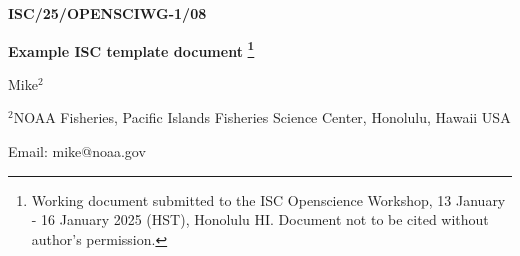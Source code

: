 \thispagestyle{empty}
\begin{flushright}
    \textbf{ISC/25/OPENSCIWG-1/08}
\end{flushright}
\vspace{1in}

\begin{center}
    \textbf{Example ISC template document}
    \textbf{\footnote{Working document submitted to the ISC Openscience Workshop, 13 January - 16 January 2025
    (HST), Honolulu HI. Document not to be cited without author’s permission.}}
    
    \vspace{0.25in}
    Mike\begin{math}^2\end{math} %

    \vspace{0.25in}
    \begin{math}^2\end{math}NOAA Fisheries, Pacific Islands Fisheries Science Center, Honolulu, Hawaii USA

    \vspace{0.25in}
    Email: mike@noaa.gov
\end{center}

\begin{figure}[!hb]
    \begin{center}
    \end{center}
\end{figure}

\clearpage
